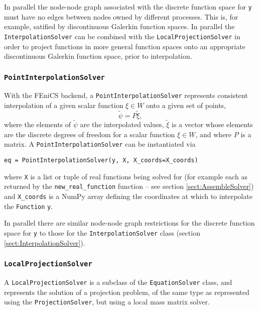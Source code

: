 \documentclass[11pt]{article}
\begin{document}
In parallel the node-node graph associated with the discrete function space for
\texttt{y} must have no edges between nodes owned by different processes. This
is, for example, satified by discontinuous Galerkin function spaces. In
parallel the \texttt{InterpolationSolver} can be combined with the
\texttt{LocalProjectionSolver} in order to project functions in more general
function spaces onto an appropriate discontinuous Galerkin function space,
prior to interpolation.

\subsubsection{\texttt{PointInterpolationSolver}}

With the FEniCS backend, a \texttt{PointInterpolationSolver} represents
consistent interpolation of a given scalar function $\xi \in W$ onto a given
set of points,
\begin{equation*}
  \tilde{\psi} = P \tilde{\xi},
\end{equation*}
where the elements of $\tilde{\psi}$ are the interpolated values, $\tilde{\xi}$
is a vector whose elements are the discrete degrees of freedom for a scalar
function $\xi \in W$, and where $P$ is a matrix. A
\texttt{PointInterpolationSolver} can be instantiated via
\begin{lstlisting}
eq = PointInterpolationSolver(y, X, X_coords=X_coords)
\end{lstlisting}
where \texttt{X} is a list or tuple of real functions being solved for (for
example each as returned by the \texttt{new\_real\_function} function -- see
section \ref{sect:AssembleSolver}) and \texttt{X\_coords} is a NumPy array
defining the coordinates at which to interpolate the \texttt{Function}
\texttt{y}.

In parallel there are similar node-node graph restrictions for the discrete
function space for \texttt{y} to those for the \texttt{InterpolationSolver}
class (section \ref{sect:InterpolationSolver}).

\subsubsection{\texttt{LocalProjectionSolver}}

A \texttt{LocalProjectionSolver} is a subclass of the \texttt{EquationSolver}
class, and represents the solution of a projection problem, of the same type as
represented using the \texttt{ProjectionSolver}, but using a local mass matrix
solver.
\end{document}
